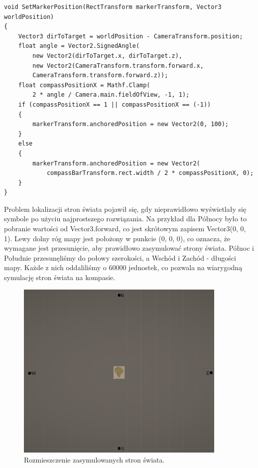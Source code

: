 \begin{lstlisting}[caption=Fragment kodu odpowiedzialny za ustawienie symbolu na pasku kompasu]
void SetMarkerPosition(RectTransform markerTransform, Vector3 worldPosition)
{
    Vector3 dirToTarget = worldPosition - CameraTransform.position;
    float angle = Vector2.SignedAngle(
        new Vector2(dirToTarget.x, dirToTarget.z), 
        new Vector2(CameraTransform.transform.forward.x, 
        CameraTransform.transform.forward.z));
    float compassPositionX = Mathf.Clamp(
        2 * angle / Camera.main.fieldOfView, -1, 1);
    if (compassPositionX == 1 || compassPositionX == (-1))
    {
        markerTransform.anchoredPosition = new Vector2(0, 100);
    }
    else
    {
        markerTransform.anchoredPosition = new Vector2(
            compassBarTransform.rect.width / 2 * compassPositionX, 0);
    }
}
\end{lstlisting}

Problem lokalizacji stron świata pojawił się, gdy nieprawidłowo wyświetlały się symbole po użyciu najprostszego rozwiązania. Na przykład dla Północy było to pobranie wartości od Vector3.forward, co jest skrótowym zapisem Vector3(0, 0, 1). Lewy dolny róg mapy jest położony w punkcie (0, 0, 0), co oznacza, że wymagane jest przesunięcie, aby prawidłowo zasymulować strony świata. Północ i Południe przesunęliśmy do połowy szerokości, a Wschód i Zachód - długości mapy. Każde z nich oddaliliśmy o 60000 jednostek, co pozwala na wiarygodną symulację stron świata na kompasie.
\begin{figure}[htbp]
    \centering
    \includegraphics[width=0.9\textwidth]{images/ui/strony_swiata.png}
    \caption{Rozmieszczenie zasymulowanych stron świata.}\label{fig:world_sides}
\end{figure}

